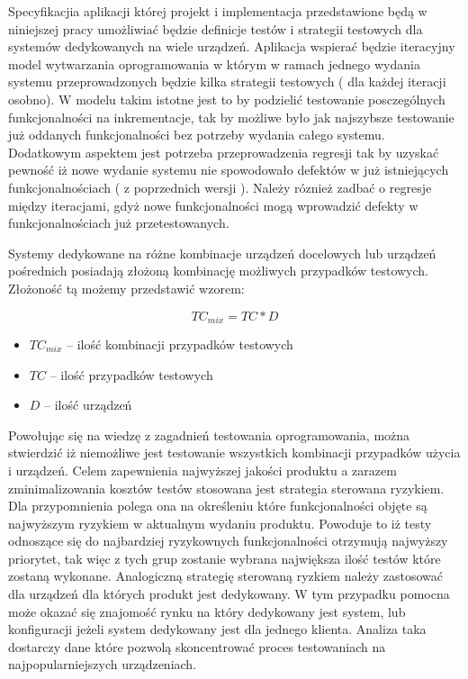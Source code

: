 Specyfikacjia aplikacji której projekt i implementacja przedstawione będą w niniejszej pracy umożliwiać będzie definicje testów i strategii testowych dla systemów dedykowanych na wiele urządzeń. Aplikacja wspierać będzie iteracyjny model wytwarzania oprogramowania w którym w ramach jednego wydania systemu przeprowadzonych będzie kilka strategii testowych ( dla każdej iteracji osobno). W modelu takim istotne jest to by podzielić testowanie posczególnych funkcjonalności na inkrementacje, tak by możliwe było jak najszybsze testowanie już oddanych funkcjonalności bez potrzeby wydania całego systemu. Dodatkowym aspektem jest potrzeba przeprowadzenia regresji tak by uzyskać pewność iż nowe wydanie systemu nie spowodowało defektów w już istniejących funkcjonalnościach ( z poprzednich wersji ). Należy róznież zadbać o regresje między iteracjami, gdyż nowe funkcjonalności mogą wprowadzić defekty w funkcjonalnościach już przetestowanych.

Systemy dedykowane na różne kombinacje urządzeń docelowych lub urządzeń pośrednich posiadają złożoną kombinację możliwych przypadków testowych. Złożoność tą możemy przedstawić wzorem:

\begin{equation}
TC_{mix} = TC * D
\end{equation}
	\begin{itemize}
		\item $TC_{mix}$ -- ilość kombinacji przypadków testowych
		\item $TC$ -- ilość przypadków testowych
		\item $D$ -- ilość urządzeń
	\end{itemize}


Powołując się na wiedzę z zagadnień testowania oprogramowania, można stwierdzić iż niemożliwe jest testowanie wszystkich kombinacji przypadków użycia i urządzeń. Celem zapewnienia najwyższej jakości produktu a zarazem zminimalizowania kosztów testów stosowana jest strategia sterowana ryzykiem. Dla przypomnienia polega ona na określeniu które funkcjonalności objęte są najwyższym ryzykiem w aktualnym wydaniu produktu. Powoduje to iż testy odnoszące się do najbardziej ryzykownych funkcjonalności otrzymują najwyższy priorytet, tak więc z tych grup zostanie wybrana największa ilość testów które zostaną wykonane. Analogiczną strategię sterowaną ryzkiem należy zastosować dla urządzeń dla których produkt jest dedykowany. W tym przypadku pomocna może okazać się znajomość rynku na który dedykowany jest system, lub konfiguracji jeżeli system dedykowany jest dla jednego klienta. Analiza taka dostarczy dane które pozwolą skoncentrować proces testowaniach na najpopularniejszych urządzeniach. 

